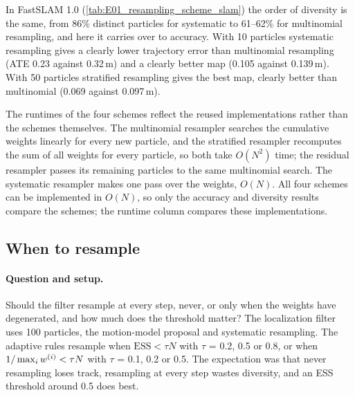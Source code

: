 In FastSLAM 1.0 (\cref{tab:E01_resampling_scheme_slam}) the order of diversity is the same, from 86\% distinct particles
for systematic to 61--62\% for multinomial resampling, and here it carries over to accuracy. With 10 particles
systematic resampling gives a clearly lower trajectory error than multinomial resampling (ATE 0.23 against 0.32\,m) and
a clearly better map (0.105 against 0.139\,m). With 50 particles stratified resampling gives the best map, clearly
better than multinomial (0.069 against 0.097\,m).

The runtimes of the four schemes reflect the reused implementations rather than the schemes themselves. The
multinomial resampler searches the cumulative weights linearly for every new particle, and the stratified resampler
recomputes the sum of all weights for every particle, so both take $O(N^2)$ time; the residual resampler passes its
remaining particles to the same multinomial search. The systematic resampler makes one pass over the weights, $O(N)$.
All four schemes can be implemented in $O(N)$, so only the accuracy and diversity results compare the schemes; the
runtime column compares these implementations.


\subsection{When to resample}\label{sec:e02}

\paragraph{Question and setup.} Should the filter resample at every step, never, or only when the weights have
degenerated, and how much does the threshold matter? The localization filter uses 100 particles, the motion-model
proposal and systematic resampling. The adaptive rules resample when $\mathrm{ESS} < \tau N$ with $\tau$ = 0.2, 0.5 or
0.8, or when $1 / \max_i w^{(i)} < \tau N$ with $\tau$ = 0.1, 0.2 or 0.5. The expectation was that never resampling
loses track, resampling at every step wastes diversity, and an ESS threshold around 0.5 does best.

